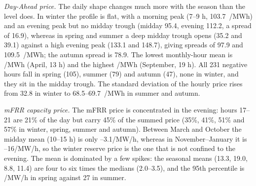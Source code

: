 \documentclass[journal]{IEEEtran}
\begin{document}
\textit{Day-Ahead price.} The daily shape changes much more with the season than the level does. In winter the profile is flat, with a morning peak (7--9 h, 103.7~\texteuro/MWh) and an evening peak but no midday trough (midday 95.4, evening 112.2, a spread of 16.9), whereas in spring and summer a deep midday trough opens (35.2 and 39.1) against a high evening peak (133.1 and 148.7), giving spreads of 97.9 and 109.5~\texteuro/MWh; the autumn spread is 78.9. The lowest monthly-hour mean is /MWh (April, 13 h) and the highest /MWh (September, 19 h). All 231 negative hours fall in spring (105), summer (79) and autumn (47), none in winter, and they sit in the midday trough. The standard deviation of the hourly price rises from 32.8 in winter to 68.5--69.7~\texteuro/MWh in summer and autumn.

\textit{mFRR capacity price.} The mFRR price is concentrated in the evening: hours 17--21 are 21\% of the day but carry 45\% of the summed price (35\%, 41\%, 51\% and 57\% in winter, spring, summer and autumn). Between March and October the midday mean (10--15 h) is only --3.1/MW/h, whereas in November--January it is --16/MW/h, so the winter reserve price is the one that is not confined to the evening. The mean is dominated by a few spikes: the seasonal means (13.3, 19.0, 8.8, 11.4) are four to six times the medians (2.0--3.5), and the 95th percentile is /MW/h in spring against 27 in summer.
\end{document}
